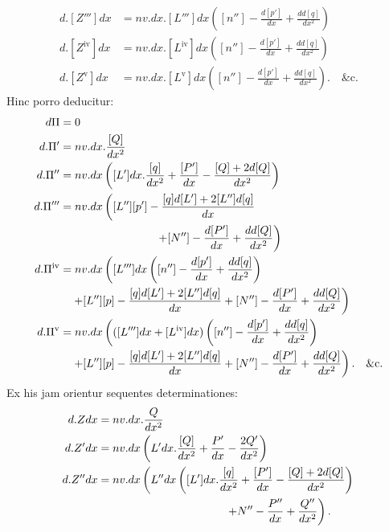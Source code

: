 \[
\begin{aligned}
d.[Z''']dx&=nv.dx.[L''']dx\left([n'']-\frac{d[p']}{dx}+\frac{dd[q]}{dx^2}\right)\\
d.[Z^{\mathrm{iv}}]dx&=nv.dx.[L^{\mathrm{iv}}]dx\left([n'']-\frac{d[p']}{dx}+\frac{dd[q]}{dx^2}\right)\\
d.[Z^{\mathrm{v}}]dx&=nv.dx.[L^{\mathrm{v}}]dx\left([n'']-\frac{d[p']}{dx}+\frac{dd[q]}{dx^2}\right).\quad\text{\&c.}
\end{aligned}
\]
Hinc porro deducitur:
\[
\begin{aligned}
d\Pi&=0\\
d.\Pi'&=nv.dx.\frac{[Q]}{dx^2}\\
d.\Pi''&=nv.dx\left([L']dx.\frac{[q]}{dx^2}+\frac{[P']}{dx}-\frac{[Q]+2d[Q]}{dx^2}\right)\\
d.\Pi'''&=nv.dx\left([L''][p']-\frac{[q]d[L']+2[L'']d[q]}{dx}\right.\\
&\hspace{30mm}\left.+[N'']-\frac{d[P']}{dx}+\frac{dd[Q]}{dx^2}\right)\\
d.\Pi^{\mathrm{iv}}&=nv.dx\left([L''']dx\left([n'']-\frac{d[p']}{dx}+\frac{dd[q]}{dx^2}\right)\right.\\
&\quad\left.+[L''][p]-\frac{[q]d[L']+2[L'']d[q]}{dx}+[N'']-\frac{d[P']}{dx}+\frac{dd[Q]}{dx^2}\right)\\
d.\Pi^{\mathrm{v}}&=nv.dx\left(([L''']dx+[L^{\mathrm{iv}}]dx)\left([n'']-\frac{d[p']}{dx}+\frac{dd[q]}{dx^2}\right)\right.\\
&\quad\left.+[L''][p]-\frac{[q]d[L']+2[L'']d[q]}{dx}+[N'']-\frac{d[P']}{dx}+\frac{dd[Q]}{dx^2}\right).\quad\text{\&c.}
\end{aligned}
\]
Ex his jam orientur sequentes determinationes:
\[
\begin{aligned}
d.Zdx&=nv.dx.\frac{Q}{dx^2}\\
d.Z'dx&=nv.dx\left(L'dx.\frac{[Q]}{dx^2}+\frac{P'}{dx}-\frac{2Q'}{dx^2}\right)\\
d.Z''dx&=nv.dx\left(L''dx\left([L']dx.\frac{[q]}{dx^2}+\frac{[P']}{dx}-\frac{[Q]+2d[Q]}{dx^2}\right)\right.\\
&\hspace{40mm}\left.+N''-\frac{P''}{dx}+\frac{Q''}{dx^2}\right).
\end{aligned}
\]
